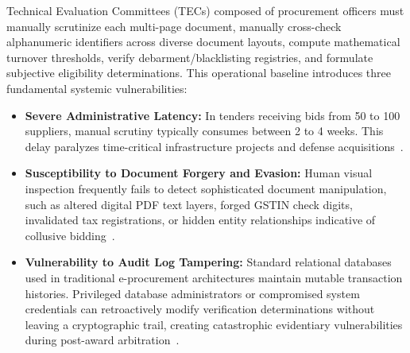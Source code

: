 \documentclass[conference]{IEEEtran}
\begin{document}
Technical Evaluation Committees (TECs) composed of procurement officers must manually scrutinize each multi-page document, manually cross-check alphanumeric identifiers across diverse document layouts, compute mathematical turnover thresholds, verify debarment/blacklisting registries, and formulate subjective eligibility determinations. This operational baseline introduces three fundamental systemic vulnerabilities:

\begin{itemize}
    \item \textbf{Severe Administrative Latency:} In tenders receiving bids from 50 to 100 suppliers, manual scrutiny typically consumes between 2 to 4 weeks. This delay paralyzes time-critical infrastructure projects and defense acquisitions~\cite{sharma2021}.
    \item \textbf{Susceptibility to Document Forgery and Evasion:} Human visual inspection frequently fails to detect sophisticated document manipulation, such as altered digital PDF text layers, forged GSTIN check digits, invalidated tax registrations, or hidden entity relationships indicative of collusive bidding~\cite{neupane2012}.
    \item \textbf{Vulnerability to Audit Log Tampering:} Standard relational databases used in traditional e-procurement architectures maintain mutable transaction histories. Privileged database administrators or compromised system credentials can retroactively modify verification determinations without leaving a cryptographic trail, creating catastrophic evidentiary vulnerabilities during post-award arbitration~\cite{rahman2023}.
\end{itemize}
\end{document}
